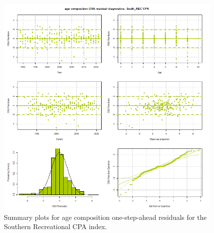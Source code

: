 \documentclass[
]{article}
\begin{document}
\begin{figure}

{\centering \includegraphics[width=1\linewidth]{../2023.RT.Runs/Run34/plots_png/diagnostics/OSA_resid_paa_6panel_South_REC_CPA} 

}

\caption{Summary plots for age composition one-step-ahead residuals for the Southern Recreational CPA index.}\label{fig:osa-South-reccpa-paa-summ}
\end{figure}
\end{document}
